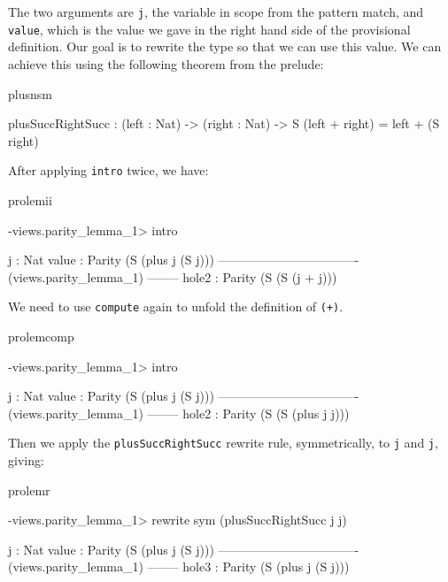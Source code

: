 \noindent
The two arguments are \texttt{j}, the variable in scope from the pattern match,
and \texttt{value}, which is the value we gave in the right hand side of the
provisional definition. Our goal is to rewrite the type so that we can use
this value.
We can achieve this using the following theorem from
the prelude:

\begin{SaveVerbatim}{plusnsm}

plusSuccRightSucc : (left : Nat) -> (right : Nat) ->
  S (left + right) = left + (S right)


\end{SaveVerbatim}

\noindent
After applying \texttt{intro} twice, we have:

\begin{SaveVerbatim}{prolemii}

-views.parity_lemma_1> intro 

  j : Nat
  value : Parity (S (plus j (S j)))
---------------------------------- (views.parity_lemma_1) --------
{hole2} : Parity (S (S (j + j)))

\end{SaveVerbatim}

\noindent
We need to use \texttt{compute} again to unfold the definition of \texttt{(+)}.

\begin{SaveVerbatim}{prolemcomp}

-views.parity_lemma_1> intro 

  j : Nat
  value : Parity (S (plus j (S j)))
---------------------------------- (views.parity_lemma_1) --------
{hole2} : Parity (S (S (plus j j)))

\end{SaveVerbatim}

\noindent
Then we apply the \texttt{plusSuccRightSucc} rewrite rule, symmetrically,
to \texttt{j} and \texttt{j}, giving:

\begin{SaveVerbatim}{prolemr}

-views.parity_lemma_1> rewrite sym (plusSuccRightSucc j j) 
 
  j : Nat
  value : Parity (S (plus j (S j)))
---------------------------------- (views.parity_lemma_1) --------
{hole3} : Parity (S (plus j (S j)))

\end{SaveVerbatim}

